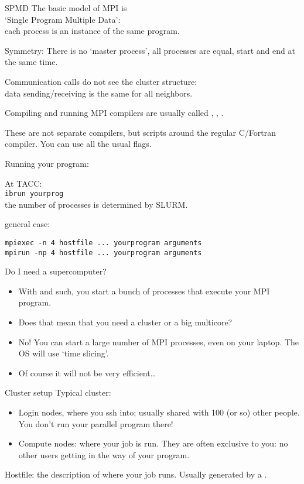 \begin{numberedframe}{SPMD}
  The basic model of MPI is\\
  `Single Program Multiple Data':\\
  each process is an instance of the same program.

  Symmetry: There is no `master process', all processes are equal,
  start and end
  at the same time.

  Communication calls do not see the cluster structure:\\
  data sending/receiving is the same for all neighbors.
\end{numberedframe}


\begin{numberedframe}{Compiling and running}
  MPI compilers are usually called ,
  , .

  These are not separate compilers,
  but scripts around the regular C/Fortran compiler. You can use all
  the usual flags.

  Running your program:
\begin{tacc}
  At TACC:\\
  \verb+ibrun yourprog+\\
  the number of processes is determined by SLURM.
\end{tacc}
general case:
\begin{verbatim}
mpiexec -n 4 hostfile ... yourprogram arguments
mpirun -np 4 hostfile ... yourprogram arguments
\end{verbatim}
\end{numberedframe}

\begin{numberedframe}{Do I need a supercomputer?}
  \begin{itemize}
  \item With  and such, you start a bunch of processes that
    execute your MPI program.
  \item Does that mean that you need a cluster or a big multicore?
  \item No! You can start a large number of MPI processes, even on
    your laptop. The OS will use `time slicing'.
  \item Of course it will not be very efficient\ldots
  \end{itemize}
\end{numberedframe}

\begin{numberedframe}{Cluster setup}
  \small
  Typical cluster:
  \begin{itemize}
  \item Login nodes, where you ssh into; usually shared with 100 (or
    so) other people. You don't run your parallel program there!
  \item Compute nodes: where your job is run. They are often exclusive
    to you: no other users getting in the way of your program.
  \end{itemize}
  Hostfile: the description of where your job runs. Usually generated
  by a .
\end{numberedframe}

